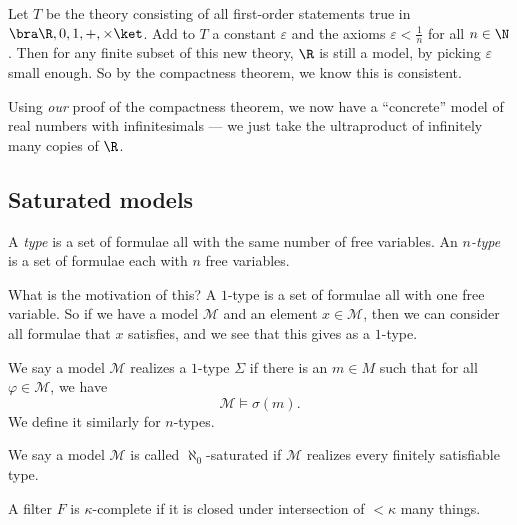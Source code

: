 \documentclass[a4paper]{article}
\begin{document}
\begin{eg}
  Let $T$ be the theory consisting of all first-order statements true in $\bra \R, 0, 1, +, \times\ket$. Add to $T$ a constant $\varepsilon$ and the axioms $\varepsilon < \frac{1}{n}$ for all $n \in \N$. Then for any finite subset of this new theory, $\R$ is still a model, by picking $\varepsilon$ small enough. So by the compactness theorem, we know this is consistent.

  Using \emph{our} proof of the compactness theorem, we now have a ``concrete'' model of real numbers with infinitesimals --- we just take the ultraproduct of infinitely many copies of $\R$.
\end{eg}

\subsection{Saturated models}

\begin{defi}[Type]
  A \emph{type} is a set of formulae all with the same number of free variables. An \emph{$n$-type} is a set of formulae each with $n$ free variables.
\end{defi}
What is the motivation of this? A $1$-type is a set of formulae all with one free variable. So if we have a model $\mathcal{M}$ and an element $x \in \mathcal{M}$, then we can consider all formulae that $x$ satisfies, and we see that this gives as a $1$-type.

\begin{defi}
  We say a model $\mathcal{M}$ realizes a $1$-type $\Sigma$ if there is an $m \in M$ such that for all $\varphi \in \mathcal{M}$, we have
  \[
    \mathcal{M} \vDash \sigma(m).
  \]
  We define it similarly for $n$-types.
\end{defi}

\begin{defi}
  We say a model $\mathcal{M}$ is called $\aleph_0$-saturated if $\mathcal{M}$ realizes every finitely satisfiable type.
\end{defi}

\begin{defi}
  A filter $F$ is $\kappa$-complete if it is closed under intersection of $<\kappa$ many things.
\end{defi}
\end{document}
